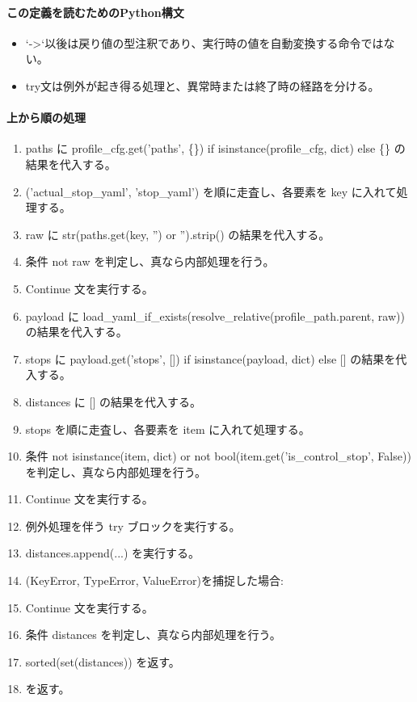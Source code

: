 \documentclass[a4paper,11pt]{article}
\begin{document}
            \paragraph{この定義を読むためのPython構文}
            \begin{itemize}[leftmargin=1.6em]
            \item `->`以後は戻り値の型注釈であり、実行時の値を自動変換する命令ではない。
\item try文は例外が起き得る処理と、異常時または終了時の経路を分ける。
            \end{itemize}
            \paragraph{上から順の処理}
            \begin{enumerate}[leftmargin=1.8em]
            \item paths に profile\_cfg.get('paths', \{\}) if isinstance(profile\_cfg, dict) else \{\} の結果を代入する。
\item ('actual\_stop\_yaml', 'stop\_yaml') を順に走査し、各要素を key に入れて処理する。
\item   raw に str(paths.get(key, '') or '').strip() の結果を代入する。
\item   条件 not raw を判定し、真なら内部処理を行う。
\item     Continue 文を実行する。
\item   payload に load\_yaml\_if\_exists(resolve\_relative(profile\_path.parent, raw)) の結果を代入する。
\item   stops に payload.get('stops', []) if isinstance(payload, dict) else [] の結果を代入する。
\item   distances に [] の結果を代入する。
\item   stops を順に走査し、各要素を item に入れて処理する。
\item     条件 not isinstance(item, dict) or not bool(item.get('is\_control\_stop', False)) を判定し、真なら内部処理を行う。
\item       Continue 文を実行する。
\item     例外処理を伴う try ブロックを実行する。
\item       distances.append(...) を実行する。
\item       (KeyError, TypeError, ValueError)を捕捉した場合:
\item       Continue 文を実行する。
\item   条件 distances を判定し、真なら内部処理を行う。
\item     sorted(set(distances)) を返す。
\item [] を返す。
            \end{enumerate}
\end{document}

